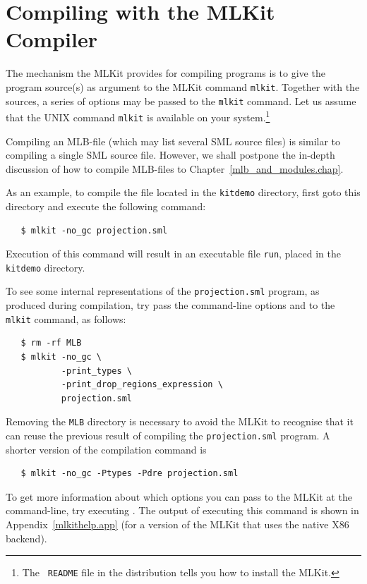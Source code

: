 \documentclass[12pt]{book}
\begin{document}
\section{Compiling with the MLKit Compiler}

The mechanism the MLKit provides for compiling programs is to give the
program source(s) as argument to the MLKit command 
%
\texttt{mlkit}.  Together with the sources, a series of options may be
passed to the \texttt{mlkit} command. Let us assume that the UNIX
command \texttt{mlkit} is available on your system.\footnote{The {\tt
    README} file in the distribution tells you how to install the
  MLKit.}

Compiling an 
%
MLB-file (which may list several SML source files) is
similar to compiling a single SML source file. However, we shall
postpone the in-depth discussion of how to compile MLB-files to
Chapter~\ref{mlb_and_modules.chap}.

As an example, to compile the file  located in
the \texttt{kitdemo} directory, first goto this directory and execute
the following command:
\begin{verbatim}
   $ mlkit -no_gc projection.sml
\end{verbatim}
Execution of this command will result in an executable file
\texttt{run}, placed in the \texttt{kitdemo} directory.

To see some internal representations of the \texttt{projection.sml}
program, as produced during compilation, try pass the command-line
options  and
 to the \texttt{mlkit}
command, as follows:
\begin{verbatim}
   $ rm -rf MLB
   $ mlkit -no_gc \
           -print_types \
           -print_drop_regions_expression \
           projection.sml
\end{verbatim}
Removing the \texttt{MLB} directory is necessary to avoid the MLKit to
recognise that it can reuse the previous result of compiling the
\texttt{projection.sml} program.  A shorter version of the compilation
command is
\begin{verbatim}
   $ mlkit -no_gc -Ptypes -Pdre projection.sml
\end{verbatim}
To get more information about which options you can pass to the MLKit
at the command-line, try executing . The output of
executing this command is shown in Appendix~\ref{mlkithelp.app} (for a
version of the MLKit that uses the native X86 backend).
\end{document}
